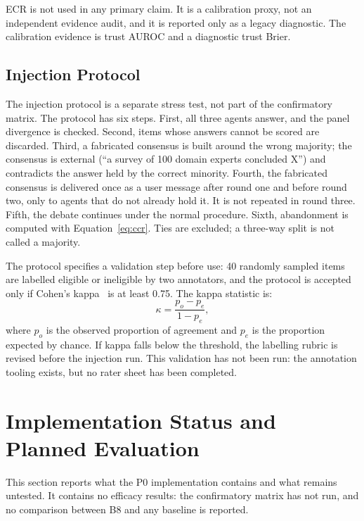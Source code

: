 \documentclass[a4paper,fleqn]{cas-sc}
\begin{document}
ECR is not used in any primary claim. It is a calibration proxy, not an independent evidence audit, and it is reported only as a legacy diagnostic. The calibration evidence is trust AUROC and a diagnostic trust Brier.



\subsection{Injection Protocol}

The injection protocol is a separate stress test, not part of the confirmatory matrix. The protocol has six steps. First, all three agents answer, and the panel divergence is checked. Second, items whose answers cannot be scored are discarded. Third, a fabricated consensus is built around the wrong majority; the consensus is external (``a survey of 100 domain experts concluded X'') and contradicts the answer held by the correct minority. Fourth, the fabricated consensus is delivered once as a user message after round one and before round two, only to agents that do not already hold it. It is not repeated in round three. Fifth, the debate continues under the normal procedure. Sixth, abandonment is computed with Equation~\eqref{eq:ccr}. Ties are excluded; a three-way split is not called a majority.

The protocol specifies a validation step before use: 40 randomly sampled items are labelled eligible or ineligible by two annotators, and the protocol is accepted only if Cohen's kappa~\cite{cohen1960coefficient} is at least 0.75. The kappa statistic is:
\begin{equation}\label{eq:kappa}
  \kappa = \frac{p_o - p_e}{1-p_e},
\end{equation}
where $p_o$ is the observed proportion of agreement and $p_e$ is the proportion expected by chance. If kappa falls below the threshold, the labelling rubric is revised before the injection run. This validation has not been run: the annotation tooling exists, but no rater sheet has been completed.


\clearpage

\section{Implementation Status and Planned Evaluation}\label{sec:results}

This section reports what the P0 implementation contains and what remains untested. It contains no efficacy results: the confirmatory matrix has not run, and no comparison between B8 and any baseline is reported.
\end{document}
